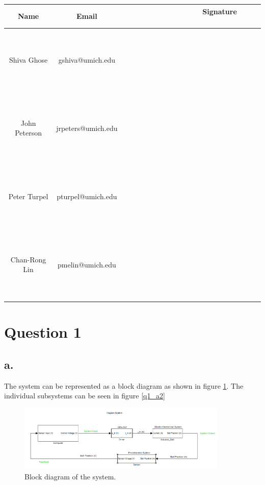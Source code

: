 \documentclass{article}
\theoremstyle{plain}
\theoremstyle{definition}
\theoremstyle{remark}
\begin{document}
\begin{table}[h]
\begin{center}
    \begin{tabular}{|c|c|c|}
        \hline
        \textbf{Name} & \textbf{Email}     & \textbf{ \ \ \ \ \  \ \  \ \ \ \ \  \ \ Signature  \ \ \ \ \  \ \ \ \ \ \ \  \ \ } \\ \hline
        	~& ~& ~\\
	~& ~& ~\\
	Shiva Ghose   & gshiva@umich.edu   & ~                  \\
	~& ~& ~\\
	~& ~& ~\\ \hline 
	~& ~& ~\\
	~& ~& ~\\
        John Peterson & jrpeters@umich.edu & ~                  \\ 
	~& ~& ~\\
	~& ~& ~\\ \hline 
	~& ~& ~\\
	~& ~& ~\\
        Peter Turpel   & pturpel@umich.edu & ~                  \\
	~& ~& ~\\
	~& ~& ~\\ \hline 
	~& ~& ~\\
	~& ~& ~\\
        Chan-Rong Lin   & pmelin@umich.edu & ~                  \\
	~& ~& ~\\
	~& ~& ~\\ \hline 
        \hline
    \end{tabular}
\end{center}
\end{table}

\newpage


\section*{Question 1}
\subsection*{a.}
The system can be represented as a block diagram as shown in figure \ref{q1_a1}. The individual subsystems can be seen in figure \ref{q1_a2}
\begin{figure}[h]
\begin{center}
\includegraphics[width=10cm]{MagLevSystem.png}
\end{center}
\caption{Block diagram of the system.}
\label{q1_a1}
\end{figure}
\end{document}

